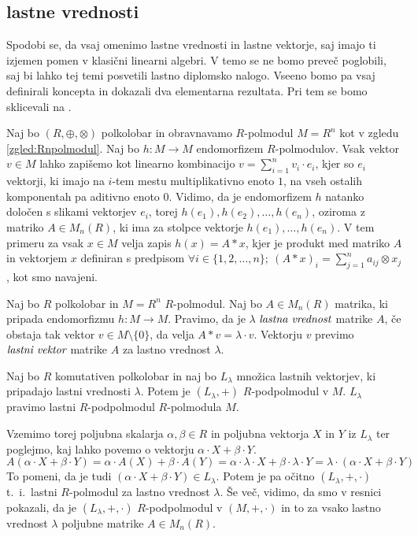 \documentclass[mat1]{fmfdelo}
\newcommand{\pojem}[1]{\ensuremath{\emph{#1}}}
\newcommand{\map}[3]{\ensuremath{{#1}:{#2}\rightarrow{#3}}}
\begin{document}
\subsection{lastne vrednosti}\label{subsect:eigen}
Spodobi se, da vsaj omenimo lastne vrednosti in lastne vektorje, saj imajo ti izjemen pomen v klasični linearni algebri. V temo se ne bomo preveč poglobili, saj bi lahko tej temi posvetili lastno diplomsko nalogo. Vseeno bomo pa vsaj definirali koncepta in dokazali dva elementarna rezultata. Pri tem se bomo sklicevali na \cite[poglavje 6]{bib:Gondran}.

Naj bo $(R, \oplus, \otimes)$ polkolobar in obravnavamo $R$-polmodul $M = R^n$ kot v zgledu \ref{zgled:Rnpolmodul}. Naj bo $\map{h}{M}{M}$ endomorfizem $R$-polmodulov. Vsak vektor $v\in M$ lahko zapišemo kot linearno kombinacijo $v = \sum_{i = 1}^{n}v_i\cdot e_i$, kjer so $e_i$ vektorji, ki imajo na $i$-tem mestu multiplikativno enoto $1$, na vseh ostalih komponentah pa aditivno enoto $0$. Vidimo, da je endomorfizem $h$ natanko določen s slikami vektorjev $e_i$, torej $h(e_1), h(e_2), \ldots, h(e_n)$, oziroma z matriko $A\in M_n(R)$, ki ima za stolpce vektorje $h(e_1), \ldots, h(e_n)$. V tem primeru za vsak $x\in M$ velja zapis $h(x) = A*x$, kjer je produkt med matriko $A$ in vektorjem $x$ definiran s predpisom $\forall i\in \{1, 2, \ldots, n\};~(A*x)_i = \sum_{j = 1}^{n} a_{ij}\otimes x_j$, kot smo navajeni.

\begin{definicija}
	Naj bo $R$ polkolobar in $M = R^n$ $R$-polmodul. Naj bo $A\in M_n(R)$ matrika, ki pripada endomorfizmu $\map{h}{M}{M}$. Pravimo, da je $\lambda$ \pojem{lastna vrednost} matrike $A$, če obstaja tak vektor $v\in M\setminus\{0\}$, da velja $A * v = \lambda \cdot v$. Vektorju $v$ previmo \pojem{lastni vektor} matrike $A$ za lastno vrednost $\lambda$.
\end{definicija}


\begin{trditev}
Naj bo $R$ komutativen polkolobar in naj bo $L_\lambda$ množica lastnih vektorjev, ki pripadajo lastni vrednosti $\lambda$. Potem je $(L_\lambda, +)$ $R$-podpolmodul v $M$. $L_\lambda$ pravimo lastni $R$-podpolmodul $R$-polmodula $M$.
\end{trditev}

\begin{dokaz}
Vzemimo torej poljubna skalarja $\alpha, \beta\in R$ in poljubna vektorja $X$ in $Y$ iz $L_\lambda$ ter poglejmo, kaj lahko povemo o vektorju $\alpha\cdot X + \beta\cdot Y$. $$A(\alpha\cdot X + \beta\cdot Y) = \alpha\cdot A(X) + \beta\cdot A(Y) = \alpha\cdot\lambda\cdot X + \beta\cdot\lambda\cdot Y = \lambda\cdot (\alpha\cdot X + \beta\cdot Y)$$ To pomeni, da je tudi $(\alpha\cdot X + \beta\cdot Y)\in L_\lambda$. Potem je pa očitno $(L_\lambda, +, \cdot)$ t.~i.~lastni $R$-polmodul za lastno vrednost $\lambda$. Še več, vidimo, da smo v resnici pokazali, da je $(L_\lambda, +, \cdot)$ $R$-podpolmodul v $(M, +, \cdot)$ in to za vsako lastno vrednost $\lambda$ poljubne matrike $A\in M_n(R)$.
\end{dokaz}
\end{document}

